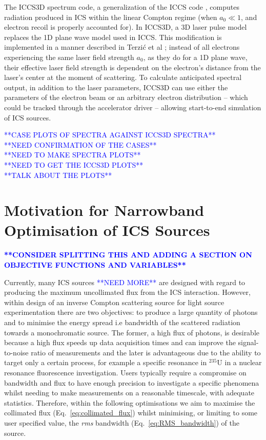 \documentclass[../main.tex]{subfiles}
\begin{document}
The \textsc{ICCS3D} spectrum code, a generalization of the \textsc{ICCS} code \cite{krafft2016laser,ranjan2018simulation}, computes radiation produced in ICS within the linear Compton regime (when $a_{0}\ll 1$, and electron recoil is properly accounted for). In \textsc{ICCS3D}, a 3D laser pulse model replaces the 1D plane wave model used in \textsc{ICCS}. This modification is implemented in a manner described in Terzi\'c et al \cite{terzic2019improving}; instead of all electrons experiencing the same laser field strength $a_{0}$, as they do for a 1D plane wave, their effective laser field strength is dependent on the electron's distance from the laser's center at the moment of scattering. To calculate anticipated spectral output, in addition to the laser parameters, \textsc{ICCS3D} can use either the parameters of the electron beam or an arbitrary electron distribution -- which could be tracked through the accelerator driver -- allowing start-to-end simulation of ICS sources. 

\textcolor{blue}{**CASE PLOTS OF SPECTRA AGAINST ICCS3D SPECTRA** \\ **NEED CONFIRMATION OF THE CASES** \\ **NEED TO MAKE SPECTRA PLOTS** \\ **NEED TO GET THE ICCS3D PLOTS** \\ **TALK ABOUT THE PLOTS**}

\section{Motivation for Narrowband Optimisation of ICS Sources}
\label{sec:motivation_optimisation}

\textcolor{blue}{\textbf{**CONSIDER SPLITTING THIS AND ADDING A SECTION ON OBJECTIVE FUNCTIONS AND VARIABLES**}}

Currently, many ICS sources \cite{deitrick2017inverse,deitrick2018high} \textcolor{blue}{**NEED MORE**} are designed with regard to producing the maximum uncollimated flux from the ICS interaction. However, within design of an inverse Compton scattering source for light source experimentation there are two objectives: to produce a large quantity of photons and to minimise the energy spread i.e bandwidth of the scattered radiation towards a monochromatic source. The former, a high flux of photons, is desirable because a high flux speeds up data acquisition times and can improve the signal-to-noise ratio of measurements and the later is advantageous due to the ability to target only a certain process, for example a specific resonance in $^{235}\mathrm{U}$ in a nuclear resonance fluorescence investigation. Users typically require a compromise on bandwidth and flux to have enough precision to investigate a specific phenomena whilst needing to make measurements on a reasonable timescale, with adequate statistics. Therefore, within the following optimisations we aim to maximise the collimated flux (Eq.~\ref{eq:collimated_flux}) whilst minimising, or limiting to some user specified value, the \textit{rms} bandwidth (Eq.~\ref{eq:RMS_bandwidth}) of the source.
\end{document}
